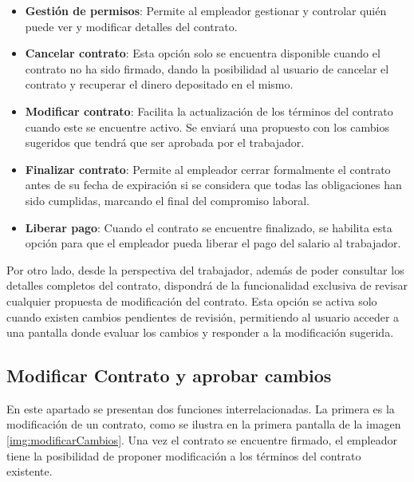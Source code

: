 \begin{itemize}
\item \textbf{Gestión de permisos}: Permite al empleador gestionar y controlar quién puede ver y modificar detalles del contrato.

\item \textbf{Cancelar contrato}: Esta opción solo se encuentra disponible cuando el contrato no ha sido firmado, dando la posibilidad al usuario de cancelar el contrato y recuperar el dinero depositado en el mismo.

\item \textbf{Modificar contrato}: Facilita la actualización de los términos del contrato cuando este se encuentre activo. Se enviará una propuesto con los cambios sugeridos que tendrá que ser aprobada por el trabajador.

\item \textbf{Finalizar contrato}: Permite al empleador cerrar formalmente el contrato antes de su fecha de expiración si se considera que todas las obligaciones han sido cumplidas, marcando el final del compromiso laboral.

\item \textbf{Liberar pago}: Cuando el contrato se encuentre finalizado, se habilita esta opción para que el empleador pueda liberar el pago del salario al trabajador.
\end{itemize}

Por otro lado, desde la perspectiva del trabajador, además de poder consultar los detalles completos del contrato, dispondrá de la funcionalidad exclusiva de revisar cualquier propuesta de modificación del contrato. Esta opción se activa solo cuando existen cambios pendientes de revisión, permitiendo al usuario acceder a una pantalla donde evaluar los cambios y responder a la modificación sugerida.


\subsection{Modificar Contrato y aprobar cambios}

En este apartado se presentan dos funciones interrelacionadas. La primera es la modificación de un contrato, como se ilustra en la primera pantalla de la imagen \ref{img:modificarCambios}. 
Una vez el contrato se encuentre firmado, el empleador tiene la posibilidad de proponer modificación a los términos del contrato existente. 

